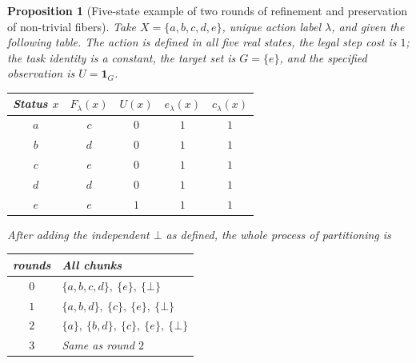 \documentclass[12pt,a4paper,openany,notitlepage]{report}
\theoremstyle{plain}
\newtheorem{proposition}[theorem]{Proposition}
\theoremstyle{definition}
\theoremstyle{remark}
\begin{document}
\begin{CJK*}
\begin{proposition}
[Five-state example of two rounds of refinement and preservation of non-trivial fibers]\label{exp:gov:five-state}
Take $X=\{a,b,c,d,e\}$, unique action label $\lambda$, and given the following table. The action is defined in all five real states, the legal step cost is $1$; the task identity is a constant, the target set is $G=\{e\}$, and the specified observation is $U=\mathbf1_G$.\begin{center}
\begin{tabular}
{ccccc}\toprule
Status $x$&
$F_\lambda(x)$&
$U(x)$&
$e_\lambda(x)$&
$c_\lambda(x)$\\
\midrule
$a$&
$c$&
$0$&
$1$&
$1$\\
$b$&
$d$&
$0$&
$1$&
$1$\\
$c$&
$e$&
$0$&
$1$&
$1$\\
$d$&
$d$&
$0$&
$1$&
$1$\\
$e$&
$e$&
$1$&
$1$&
$1$\\
\bottomrule
\end{tabular}
\end{center}
After adding the independent $\bot$ as defined, the whole process of partitioning is\begin{center}
\begin{tabular}
{cl}\toprule
rounds&
All chunks\\
\midrule
$0$&
$\{a,b,c,d\},\ \{e\},\ \{\bot\}$\\
$1$&
$\{a,b,d\},\ \{c\},\ \{e\},\ \{\bot\}$\\
$2$&
$\{a\},\ \{b,d\},\ \{c\},\ \{e\},\ \{\bot\}$\\
$3$&
Same as round $2$\\


\end{tabular}
\end{center}
\end{proposition}
\end{CJK*}
\end{document}
